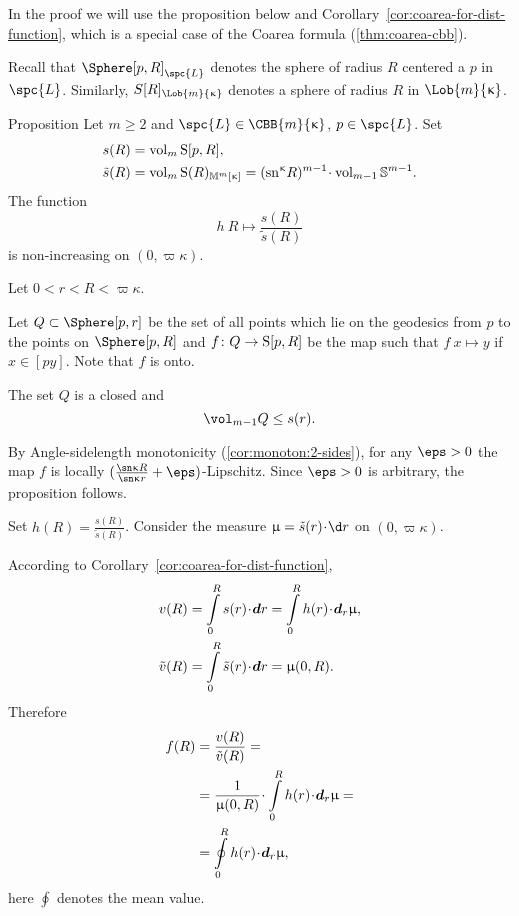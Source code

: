 In the proof we will use the proposition below and 
Corollary~\ref{cor:coarea-for-dist-function},
which is a special case of the Coarea formula (\ref{thm:coarea-cbb}).

Recall that $\Sphere[p,R]_{\spc{L}}$ denotes the sphere of radius $R$ centered a $p$ in $\spc{L}$.
Similarly,  $S[R]_{\Lob{m}{\kappa}}$ denotes  a sphere of radius $R$ in ${\Lob{m}{\kappa}}$.

\begin{thm}{Proposition}\label{prop:monotonic-spheres}
Let $m\ge 2$ and 
$\spc{L}\in\CBB{m}{\kappa}$, 
$p\in \spc{L}$.
Set
\begin{align*}
s(R)&=\vol_m\Sphere[p,R],
\\
\~s(R)&=\vol_m\Sphere(R)_{\Lob{m}{\kappa}}=(\sn\kappa R)^{m-1}\cdot\vol_{m-1}\SS^{m-1}.
\end{align*}
The function 
\[
h\: R\mapsto \frac {s(R)}{\tilde s(R)}
\]
is non-increasing on $(0,\varpi\kappa)$.
\end{thm}

Let $0<r<R<\varpi\kappa$.

Let $Q\subset \Sphere[p,r]$ be the set of all points 
which lie on the geodesics from $p$ to the points on $\Sphere[p,R]$
and $f\:Q\to \Sphere[p,R]$ be the map such that $f\:x\mapsto y$ if $x\in [py]$.
Note that $f$ is onto.

The set $Q$ is a closed
and 
\[\vol_{m-1}Q\le s(r).\]

By Angle-sidelength  monotonicity (\ref{cor:monoton:2-sides}), 
for any $\eps>0$ the map $f$ is 
locally $(\tfrac{\sn\kappa R}{\sn\kappa r}+\eps)$-Lipschitz.
Since $\eps>0$ is arbitrary, the proposition follows.
\qeds


Set $h(R)= \frac {s(R)}{\tilde s(R)}$.
Consider the measure $\mu=\tilde s(r)\cdot\d r$ on  $(0,\varpi\kappa)$.

According to Corollary~\ref{cor:coarea-for-dist-function},
\begin{align*}
v(R)&=\int\limits_0^R s(r)\cdot\d r=\int\limits_0^R h(r)\cdot\d_r \mu,
\\
\~v(R)&=\int\limits_0^R\tilde s(r)\cdot\d r=\mu(0,R).
\end{align*}
Therefore
\begin{align*}
f(R)&=\frac{v(R)}{\~v(R)}=
\\
&=\frac1{\mu(0,R)}\cdot\int\limits_0^R h(r)\cdot\d_r\mu=
\\
&=\oint\limits_0^R h(r)\cdot\d_r\mu,
\end{align*}
here $\oint$ denotes the mean value.

